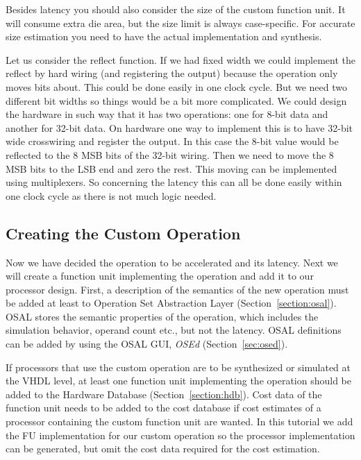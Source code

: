 \documentclass[twoside]{tceusermanual}
\begin{document}
Besides latency you should also consider the size of the custom function unit.
It will consume extra die area, but the size limit is always case-specific. For
accurate size estimation you need to have the actual implementation and synthesis.

Let us consider the reflect function. If we had fixed width we could implement
the reflect by hard wiring (and registering the output) because the operation
only moves bits about. This could be done easily in one clock cycle. But we
need two different bit widths so things would be a bit more complicated. We
could design the hardware in such way that it has two operations: one for 8-bit
data and another for 32-bit data. On hardware one way to implement this is to
have 32-bit wide crosswiring and register the output. In this case the 8-bit
value would be reflected to the 8 MSB bits of the 32-bit wiring. Then we need
to move the 8 MSB bits to the LSB end and zero the rest. This moving can be
implemented using multiplexers. So concerning the latency this can all be done
easily within one clock cycle as there is not much logic needed.

\subsection{Creating the Custom Operation}
\label{section:customOperations}

Now we have decided the operation to be accelerated and its latency. Next we
will create a function unit implementing the operation and add it to our
processor design. First, a description of
the semantics of the new operation must be added at least to Operation Set
Abstraction Layer (Section~\ref{section:osal}). OSAL stores the semantic
properties of the operation, which includes the simulation behavior, operand
count etc., but not the latency. OSAL definitions can be added by using the
OSAL GUI, \emph{OSEd} (Section~\ref{sec:osed}).

If processors that use the custom operation are to be synthesized or simulated
at the VHDL level, at least one function unit implementing
the operation should be added to the
Hardware Database (Section~\ref{section:hdb}). Cost data of the function unit
needs to be added to the cost database if cost estimates of a processor
containing the custom function unit are wanted. In this tutorial we add the
FU implementation for our custom operation so the processor implementation can
be generated, but omit the cost data required for the cost estimation.
\end{document}
